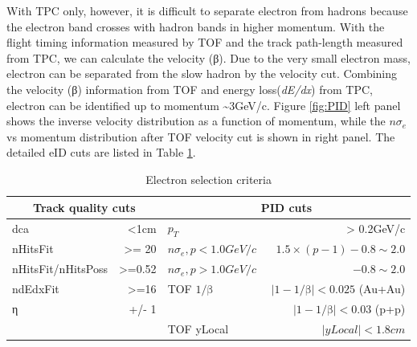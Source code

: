 With TPC only, however, it is difficult to separate electron from
hadrons because the electron band crosses with hadron bands in higher
momentum. With the flight timing information measured by TOF and the
track path-length measured from TPC, we can calculate the velocity
(β). Due to the very small electron mass, electron can be separated
from the slow hadron by the velocity cut. Combining the velocity (β)
information from TOF and energy loss(\emph{dE/dx}) from TPC, electron
can be identified up to momentum \textasciitilde{}3GeV/c. Figure \ref{fig:PID}
left panel shows the inverse velocity distribution as a function of
momentum, while the $n\sigma_{e}$ vs momentum distribution after
TOF velocity cut is shown in right panel. The detailed eID cuts are
listed in Table \ref{table:track and pid cut}.

\begin{table}[H]
\begin{centering}
\begin{tabular}{lr|lr}
\hline 
\multicolumn{2}{c|}{Track quality cuts} & \multicolumn{2}{c}{PID cuts}\tabularnewline
\hline 
\hline 
dca  & <1cm & $ $$p_{T}$  & > 0.2GeV/c\tabularnewline
nHitsFit  & >= 20 & $n\sigma_{e},p<1.0GeV/c$ $ $ & $1.5\times(p-1)-0.8\sim2.0$\tabularnewline
nHitsFit/nHitsPoss  & >=0.52 & $n\sigma_{e},p>1.0GeV/c$  & $-0.8\sim2.0$\tabularnewline
ndEdxFit  & >=16 & TOF $1/\text{β}$ & $|1-1/\text{β}|<0.025$ (Au+Au)\tabularnewline
η  & +/- 1 &  & $|1-1/\text{β}|<0.03$ (p+p)\tabularnewline
 &  & TOF yLocal &  $|yLocal|<1.8cm$\tabularnewline
\hline 
\end{tabular}
\par\end{centering}

\protect\caption{Electron selection criteria}
\label{table:track and pid cut}
\end{table}


